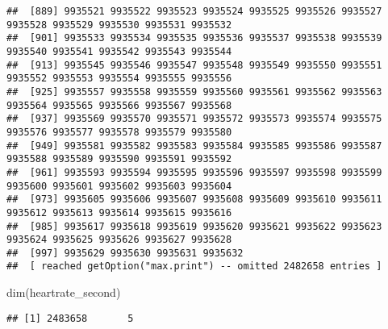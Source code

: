 \documentclass[
]{article}
\newenvironment{Shaded}{\begin{snugshade}}{\end{snugshade}}
\newcommand{\FunctionTok}[1]{\textcolor[rgb]{0.00,0.00,0.00}{#1}}
\newcommand{\NormalTok}[1]{#1}
\begin{document}
\begin{verbatim}
##  [889] 9935521 9935522 9935523 9935524 9935525 9935526 9935527 9935528 9935529 9935530 9935531 9935532
##  [901] 9935533 9935534 9935535 9935536 9935537 9935538 9935539 9935540 9935541 9935542 9935543 9935544
##  [913] 9935545 9935546 9935547 9935548 9935549 9935550 9935551 9935552 9935553 9935554 9935555 9935556
##  [925] 9935557 9935558 9935559 9935560 9935561 9935562 9935563 9935564 9935565 9935566 9935567 9935568
##  [937] 9935569 9935570 9935571 9935572 9935573 9935574 9935575 9935576 9935577 9935578 9935579 9935580
##  [949] 9935581 9935582 9935583 9935584 9935585 9935586 9935587 9935588 9935589 9935590 9935591 9935592
##  [961] 9935593 9935594 9935595 9935596 9935597 9935598 9935599 9935600 9935601 9935602 9935603 9935604
##  [973] 9935605 9935606 9935607 9935608 9935609 9935610 9935611 9935612 9935613 9935614 9935615 9935616
##  [985] 9935617 9935618 9935619 9935620 9935621 9935622 9935623 9935624 9935625 9935626 9935627 9935628
##  [997] 9935629 9935630 9935631 9935632
##  [ reached getOption("max.print") -- omitted 2482658 entries ]
\end{verbatim}

\begin{Shaded}
\begin{Highlighting}[]
\FunctionTok{dim}\NormalTok{(heartrate\_second)}
\end{Highlighting}
\end{Shaded}

\begin{verbatim}
## [1] 2483658       5
\end{verbatim}
\end{document}
